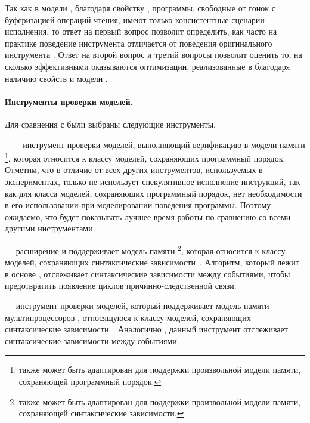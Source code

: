 Так как в модели \WkmS, благодаря свойству \LBRF, программы, 
свободные от гонок с буферизацией операций чтения, 
имеют только \RCMM консистентные сценарии исполнения, 
то ответ на первый вопрос позволит определить, как часто 
на практике поведение инструмента \wmc отличается от поведения 
оригинального инструмента \genmc.
Ответ на второй вопрос и третий вопросы позволит оценить то, на сколько эффективными 
оказываются оптимизации, реализованные в \wmc благодаря 
наличию свойств \LBRF и \CL  модели \WkmS.


\paragraph{Инструменты проверки моделей.}

Для сравнения с  \wmc были выбраны следующие инструменты. 

\textbf{\genmc}~\cite{Kokologiannakis:PLDI2019,Kokologiannakis:CAD2021} ---
инструмент проверки моделей, выполняющий верификацию в модели памяти \RCMM%
\footnote{\genmc также может быть адаптирован для поддержки 
  произвольной модели памяти, сохраняющей программный порядок.}, 
которая относится к классу моделей, сохраняющих программный порядок.  
Отметим, что в отличие от всех других инструментов, используемых в экспериментах, 
только \genmc не использует спекулятивное исполнение инструкций, так как для класса моделей, сохраняющих программный порядок,
нет необходимости в его использовании при моделировании поведения программы. 
Поэтому ожидаемо, что \genmc будет показывать 
лучшее время работы по сравнению со всеми другими инструментами. 

\textbf{\hmc} --- 
расширение \genmc и поддерживает  модель памяти \IMM
\footnote{\hmc также может быть адаптирован для поддержки 
  произвольной модели памяти, сохраняющей синтаксические зависимости.},
которая относится к классу моделей, сохраняющих синтаксические зависимости~\cite{Kokologiannakis-Vafeiadis:ASPLOS2020}.  
Алгоритм, который лежит в основе \hmc, отслеживает синтаксические зависимости между событиями, 
чтобы предотвратить появление циклов причинно-следственной связи. 

 \textbf{\Nidhugg} --- инструмент проверки моделей, который поддерживает модель памяти мультипроцессоров \POWER, 
относящуюся к классу моделей, сохраняющих синтаксические зависимости~\cite{Abdulla-al:TACAS2015,Abdulla-al:CAV2016}.  
Аналогично \hmc, данный инструмент отслеживает синтаксические зависимости между событиями.

